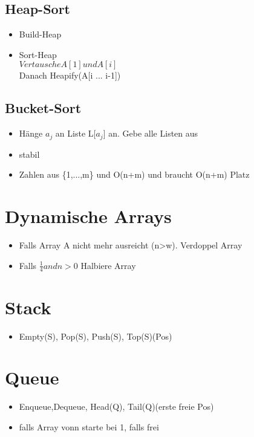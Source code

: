 \documentclass{article}
\begin{document}
\subsection{Heap-Sort}
\begin{itemize}
\item Build-Heap
\item Sort-Heap \\
$Vertausche A[1] und A[i]$\\
Danach Heapify(A[i ... i-1])\\
\end{itemize}

\subsection{Bucket-Sort}
\begin{itemize}
\item H{\"a}nge $a_j$ an Liste L[$a_j$] an. Gebe alle Listen aus
\item stabil
\item Zahlen aus \{1,...,m\} und O(n+m) und braucht O(n+m) Platz
\end{itemize}

\section{Dynamische Arrays}
\begin{itemize}
\item Falls Array A nicht mehr ausreicht (n>w). Verdoppel Array 
\item Falls $\frac{1}{4} and n>0$ Halbiere Array
\end{itemize}

\section{Stack}
\begin{itemize}
\item Empty(S), Pop(S), Push(S), Top(S)(Pos)
\end{itemize}

\section{Queue}
\begin{itemize}
\item Enqueue,Dequeue, Head(Q), Tail(Q)(erste freie Pos)
\item falls Array vonn starte bei 1, falls frei
\end{itemize}
\end{document}
